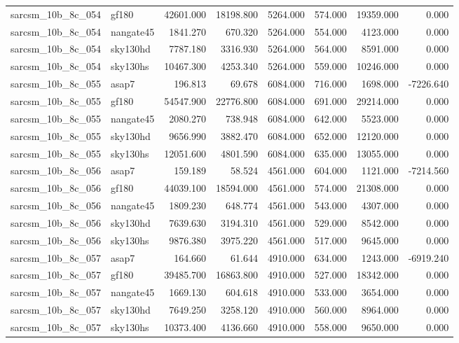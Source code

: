\begin{tabular}{llrrrrrr}
sarcsm\_10b\_8c\_054 & gf180 & 42601.000 & 18198.800 & 5264.000 & 574.000 & 19359.000 & 0.000 \\
sarcsm\_10b\_8c\_054 & nangate45 & 1841.270 & 670.320 & 5264.000 & 554.000 & 4123.000 & 0.000 \\
sarcsm\_10b\_8c\_054 & sky130hd & 7787.180 & 3316.930 & 5264.000 & 564.000 & 8591.000 & 0.000 \\
sarcsm\_10b\_8c\_054 & sky130hs & 10467.300 & 4253.340 & 5264.000 & 559.000 & 10246.000 & 0.000 \\
sarcsm\_10b\_8c\_055 & asap7 & 196.813 & 69.678 & 6084.000 & 716.000 & 1698.000 & -7226.640 \\
sarcsm\_10b\_8c\_055 & gf180 & 54547.900 & 22776.800 & 6084.000 & 691.000 & 29214.000 & 0.000 \\
sarcsm\_10b\_8c\_055 & nangate45 & 2080.270 & 738.948 & 6084.000 & 642.000 & 5523.000 & 0.000 \\
sarcsm\_10b\_8c\_055 & sky130hd & 9656.990 & 3882.470 & 6084.000 & 652.000 & 12120.000 & 0.000 \\
sarcsm\_10b\_8c\_055 & sky130hs & 12051.600 & 4801.590 & 6084.000 & 635.000 & 13055.000 & 0.000 \\
sarcsm\_10b\_8c\_056 & asap7 & 159.189 & 58.524 & 4561.000 & 604.000 & 1121.000 & -7214.560 \\
sarcsm\_10b\_8c\_056 & gf180 & 44039.100 & 18594.000 & 4561.000 & 574.000 & 21308.000 & 0.000 \\
sarcsm\_10b\_8c\_056 & nangate45 & 1809.230 & 648.774 & 4561.000 & 543.000 & 4307.000 & 0.000 \\
sarcsm\_10b\_8c\_056 & sky130hd & 7639.630 & 3194.310 & 4561.000 & 529.000 & 8542.000 & 0.000 \\
sarcsm\_10b\_8c\_056 & sky130hs & 9876.380 & 3975.220 & 4561.000 & 517.000 & 9645.000 & 0.000 \\
sarcsm\_10b\_8c\_057 & asap7 & 164.660 & 61.644 & 4910.000 & 634.000 & 1243.000 & -6919.240 \\
sarcsm\_10b\_8c\_057 & gf180 & 39485.700 & 16863.800 & 4910.000 & 527.000 & 18342.000 & 0.000 \\
sarcsm\_10b\_8c\_057 & nangate45 & 1669.130 & 604.618 & 4910.000 & 533.000 & 3654.000 & 0.000 \\
sarcsm\_10b\_8c\_057 & sky130hd & 7649.250 & 3258.120 & 4910.000 & 560.000 & 8964.000 & 0.000 \\
sarcsm\_10b\_8c\_057 & sky130hs & 10373.400 & 4136.660 & 4910.000 & 558.000 & 9650.000 & 0.000 \\

\end{tabular}
